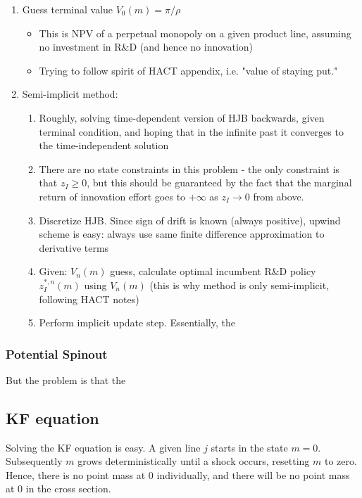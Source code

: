 \documentclass[12pt,english]{article}
\theoremstyle{remark}
\begin{document}
\begin{enumerate}
	\item Guess terminal value $V_0(m) = \pi / \rho$
	\begin{itemize}
		\item This is NPV of a perpetual monopoly on a given product line, assuming no investment in R\&D (and hence no innovation)
		\item Trying to follow spirit of HACT appendix, i.e. "value of staying put."
	\end{itemize}
	\item Semi-implicit method:
	\begin{enumerate}
		\item Roughly, solving time-dependent version of HJB backwards, given terminal condition, and hoping that in the infinite past it converges to the time-independent solution
		\item There are no state constraints in this problem - the only constraint is that $z_I \ge 0$, but this should be guaranteed by the fact that the marginal return of innovation effort goes to $+\infty$ as $z_I \to 0$ from above. 
		\item Discretize HJB. Since sign of drift is known (always positive), upwind scheme is easy: always use same finite difference approximation to derivative terms
		\item Given: $V_n(m)$ guess, calculate optimal incumbent R\&D policy $z_I^{*,n}(m)$ using $V_n(m)$ (this is why method is only semi-implicit, following HACT notes)
		\item Perform implicit update step. Essentially, the 
	\end{enumerate}
\end{enumerate}

\subsubsection{Potential Spinout}


But the problem is that the 



	

\subsection{KF equation}

Solving the KF equation is easy. A given line $j$ starts in the state $m = 0$. Subsequently $m$ grows deterministically until a shock occurs, resetting $m$ to zero. Hence, there is no point mass at 0 individually, and there will be no point mass at 0 in the cross section. 
\end{document}
